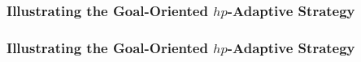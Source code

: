 \begin{frame}
	\frametitle{Illustrating the Goal-Oriented $hp$-Adaptive Strategy}
	\begin{figure}[t!]
	\end{figure}
\end{frame}

\begin{frame}
	\frametitle{Illustrating the Goal-Oriented $hp$-Adaptive Strategy}
\end{frame}